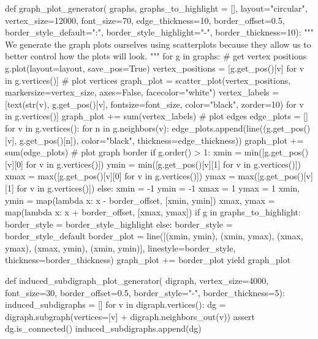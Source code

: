 \documentclass[times,a4paper,10pt,twocolumn]{article}
\theoremstyle{definition}
\theoremstyle{definition}
\theoremstyle{plain}
\begin{document}
\begin{sagesilent}
def graph_plot_generator(
        graphs,
        graphs_to_highlight = [],
        layout="circular",
        vertex_size=12000,
        font_size=70,
        edge_thickness=10,
        border_offset=0.5,
        border_style_default=":",
        border_style_highlight="-",
        border_thickness=10):
    """
    We generate the graph plots ourselves using scatterplots because they allow
    us to better control how the plots will look.
    """
    for g in graphs:
        # get vertex positions
        g.plot(layout=layout, save_pos=True)
        vertex_positions = [g.get_pos()[v] for v in g.vertices()]
        # plot vertices
        graph_plot = scatter_plot(vertex_positions, markersize=vertex_size,
            axes=False, facecolor="white")
        vertex_labels = [text(str(v), g.get_pos()[v], fontsize=font_size,
            color="black", zorder=10) for v in g.vertices()]
        graph_plot += sum(vertex_labels)
        # plot edges
        edge_plots = []
        for v in g.vertices():
            for n in g.neighbors(v):
                edge_plots.append(line((g.get_pos()[v], g.get_pos()[n]),
                    color="black", thickness=edge_thickness))
        graph_plot += sum(edge_plots)
        # plot graph border
        if g.order() > 1:
            xmin = min([g.get_pos()[v][0] for v in g.vertices()])
            ymin = min([g.get_pos()[v][1] for v in g.vertices()])
            xmax = max([g.get_pos()[v][0] for v in g.vertices()])
            ymax = max([g.get_pos()[v][1] for v in g.vertices()])
        else:
            xmin = -1
            ymin = -1
            xmax =  1
            ymax =  1
        xmin, ymin = map(lambda x: x - border_offset, [xmin, ymin])
        xmax, ymax = map(lambda x: x + border_offset, [xmax, ymax])
        if g in graphs_to_highlight:
            border_style = border_style_highlight
        else:
            border_style = border_style_default
        border_plot = line([(xmin, ymin), (xmin, ymax),
            (xmax, ymax), (xmax, ymin), (xmin, ymin)],
            linestyle=border_style, thickness=border_thickness)
        graph_plot += border_plot
        yield graph_plot

def induced_subdigraph_plot_generator(
        digraph,
        vertex_size=4000,
        font_size=30,
        border_offset=0.5,
        border_style="-",
        border_thickness=5):
    induced_subdigraphs = []
    for v in digraph.vertices():
        dg = digraph.subgraph(vertices=[v] + digraph.neighbors_out(v))
        assert dg.is_connected()
        induced_subdigraphs.append(dg)


\end{sagesilent}
\end{document}
